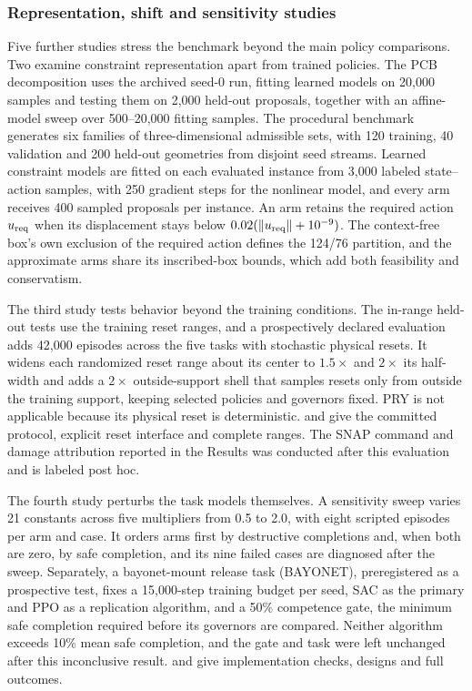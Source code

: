 \documentclass[12pt]{article}
\begin{document}
\subsubsection{Representation, shift and sensitivity studies}
\label{sec:model-validation}
Five further studies stress the benchmark beyond the main policy comparisons.
Two examine constraint representation apart from trained policies. The PCB
decomposition uses the archived seed-0 run, fitting learned models on 20,000
samples and testing them on 2,000 held-out proposals, together with an
affine-model sweep over 500--20,000 fitting samples. The procedural benchmark
generates six families of three-dimensional admissible sets, with 120
training, 40 validation and 200 held-out geometries from disjoint seed streams.
Learned constraint models are fitted on each evaluated instance from 3,000
labeled state--action samples, with 250 gradient steps for the nonlinear model,
and every arm receives 400 sampled proposals per instance. An arm retains the
required action $u_{\rm req}$ when its displacement stays below
$0.02(\|u_{\rm req}\|+10^{-9})$. The context-free box's own exclusion of the
required action defines the 124/76 partition, and the approximate arms share
its inscribed-box bounds, which add both feasibility and
conservatism.

The third study tests behavior beyond the training conditions. The in-range
held-out tests use the training reset ranges, and a prospectively declared
evaluation adds 42,000 episodes across the five tasks with stochastic physical
resets. It widens each randomized reset range about its center to $1.5\times$
and $2\times$ its half-width and adds a $2\times$ outside-support shell that
samples resets only from outside the training support, keeping selected
policies and governors fixed. PRY is not applicable because its physical reset
is deterministic.  and  give the
committed protocol, explicit reset interface and complete ranges. The SNAP
command and damage attribution reported in the Results was conducted after this
evaluation and is labeled post hoc.

The fourth study perturbs the task models themselves. A sensitivity sweep
varies 21 constants across five multipliers from 0.5 to 2.0, with eight
scripted episodes per arm and case. It orders arms first by destructive
completions and, when both are zero, by safe completion, and its nine failed
cases are diagnosed after the sweep. Separately, a bayonet-mount release task
(BAYONET), preregistered as a prospective test, fixes a 15,000-step training budget per seed,
SAC as the primary and PPO as a replication algorithm, and a 50\% competence
gate, the minimum safe completion required before its governors are compared.
Neither algorithm exceeds 10\% mean safe completion, and the gate and task were
left unchanged after this inconclusive result.  and  give implementation checks, designs and full outcomes.
\end{document}
